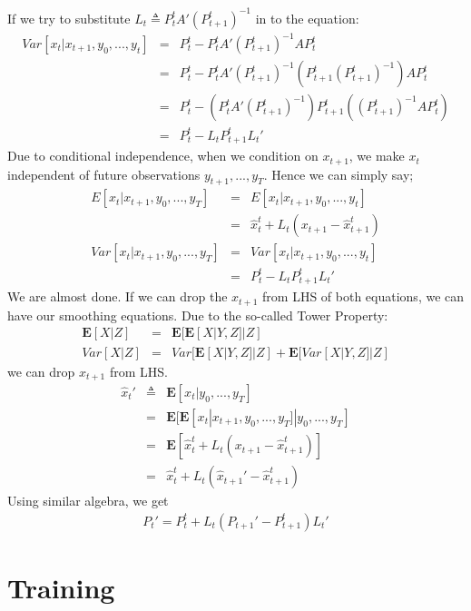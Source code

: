 If we try to substitute $L_t \triangleq P_{t}^tA'(P_{t+1}^t)^{-1}$ in to the
equation:
\begin{eqnarray*}
Var[x_t|x_{t+1},y_0,...,y_t] &=& P_{t}^t - P_{t}^t A'(P_{t+1}^t)^{-1}AP_{t}^t \\
&=& P_{t}^t - P_{t}^tA'(P_{t+1}^t)^{-1} (P_{t+1}^t(P_{t+1}^t)^{-1}) AP_{t}^t\\
&=& P_{t}^t - (P_{t}^tA'(P_{t+1}^t)^{-1}) P_{t+1}^t ((P_{t+1}^t)^{-1} AP_{t}^t)\\
&=& P_{t}^t - L_t  P_{t+1}^t L_t'
\end{eqnarray*}
Due to conditional independence, when we condition on $x_{t+1}$, we make $x_t$
independent of future observations $y_{t+1},...,y_T$. Hence we can simply say;
\begin{eqnarray*}
E[x_t|x_{t+1},y_0,...,y_T]  &=& E[x_t|x_{t+1},y_0,...,y_t]\\
&=& \hat{x}_{t}^t +L_t(x_{t+1}-\hat{x}_{t+1}^t) \\
Var[x_t|x_{t+1},y_0,...,y_T]  &=& Var[x_t|x_{t+1},y_0,...,y_t] \\
&=& P_{t}^t - L_t  P_{t+1}^t L_t'
\end{eqnarray*}
We are almost done. If we can drop the $x_{t+1}$ from LHS of both equations, we
can have our smoothing equations. Due to the so-called Tower Property:
\begin{eqnarray*}
\mathbf{E}[X|Z] &=& \mathbf{E}[\mathbf{E}[X|Y,Z]|Z]\\
Var[X|Z] &=& Var[\mathbf{E}[X|Y,Z]|Z] + \mathbf{E}[Var[X|Y,Z]|Z]
\end{eqnarray*}
we can drop $x_{t+1}$ from LHS.
\begin{eqnarray}
\hat{x}_{t}' & \triangleq & \mathbf{E}[x_t|y_0,...,y_T] \nonumber\\
& = & \mathbf{E}[\mathbf{E}[x_t|x_{t+1},y_0,...,y_T]|y_0,...,y_T] \nonumber\\
& = & \mathbf{E}[\hat{x}_{t}^t +L_t(x_{t+1}-\hat{x}_{t+1}^t)] \nonumber\\
& = & \hat{x}_{t}^t +L_t(\hat{x}_{t+1}' -\hat{x}_{t+1}^t) \label{xsmooth}
\end{eqnarray}
Using similar algebra, we get
\begin{eqnarray*}
P_{t}'  = P_{t}^t + L_t(P_{t+1}'-P_{t+1}^t)L_t'
\end{eqnarray*}


\section{Training}

